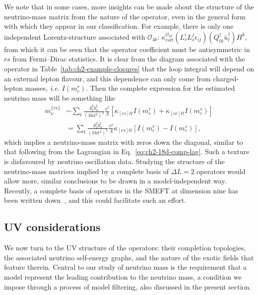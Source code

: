 We note that in some cases, more insights can be made about the structure of the
neutrino-mass matrix from the nature of the operator, even in the general form
with which they appear in our classification. For example, there is only one
independent Lorentz-structure associated with $\mathcal{O}_{4b}$:
$\kappa^{\mathcal{O}_{4b}}_{rstt} (L^{i}_{r} L^{j}_{s} \epsilon_{ij})(Q^{\dagger}_{t k}\bar{u}^{\dagger}_{t})H^{k}$,
from which it can be seen that the operator coefficient must be antisymmetric in
$rs$ from Fermi--Dirac statistics. It is clear from the diagram associated with
the operator in Table~\ref{tab:ch2-example-closures} that the loop integral will
depend on an external lepton flavour, and this dependence can only come from
charged-lepton masses, \textit{i.e.} $I(m_{e}^{r})$. Then the complete
expression for the estimated neutrino mass will be something like
\begin{align}
  m_{\nu}^{\{rs\}} &\sim \sum_{t} \frac{g_{2}^{2} y_{u}^{t}}{(16\pi^{2})^{2}} \frac{v^{2}}{\Lambda} [\kappa_{[rs]tt} I(m_{e}^{r}) + \kappa_{[sr]tt} I(m_{e}^{s})] \\
  &= \sum_{t} \frac{g_{2}^{2} y_{u}^{t}}{(16\pi^{2})^{2}} \frac{v^{2}}{\Lambda} \kappa_{[rs]tt}  [I(m_{e}^{r}) - I(m_{e}^{s})],
\end{align}
which implies a neutrino-mass matrix with zeros down the diagonal, similar to
that following from the Lagrangian in Eq.~\eqref{eq:ch2-18d-comp-lag}. Such a
texture is disfavoured by neutrino oscillation data. Studying the structure of
the neutrino-mass matrices implied by a complete basis of $\Delta L = 2$
operators would allow more, similar conclusions to be drawn in a
model-independent way. Recently, a complete basis of operators in the SMEFT at
dimension nine has been written down~\cite{Li:2020xlh}, and this could
facilitate such an effort.

\subsection{UV considerations}
\label{sec:ch2-uvconsiderations}

We now turn to the UV structure of the operators: their completion topologies,
the associated neutrino self-energy graphs, and the nature of the exotic fields
that feature therein. Central to our study of neutrino mass is the requirement
that a model represent the leading contribution to the neutrino mass, a
condition we impose through a process of model filtering, also discussed in the
present section.

